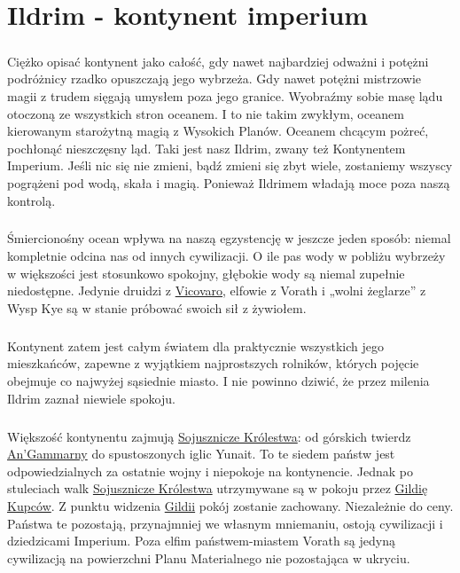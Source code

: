 \chapter{Ildrim - kontynent imperium}

\paragraph{}
Ciężko opisać kontynent jako całość, gdy nawet najbardziej odważni i potężni podróżnicy rzadko opuszczają jego wybrzeża.
Gdy nawet potężni mistrzowie magii z trudem sięgają umysłem poza jego granice. 
Wyobraźmy sobie masę lądu otoczoną ze wszystkich stron oceanem.
I to nie takim zwykłym, oceanem kierowanym starożytną magią z Wysokich Planów.
Oceanem chcącym pożreć, pochłonąć nieszczęsny ląd.
Taki jest nasz Ildrim, zwany też Kontynentem Imperium.
Jeśli nic się nie zmieni, bądź zmieni się zbyt wiele, zostaniemy wszyscy pogrążeni pod wodą, skała i magią.
Ponieważ Ildrimem władają moce poza naszą kontrolą.

\paragraph{}
Śmiercionośny ocean wpływa na naszą egzystencję w jeszcze jeden sposób: niemal kompletnie odcina nas od innych cywilizacji.
O ile pas wody w pobliżu wybrzeży w większości jest stosunkowo spokojny, głębokie wody są niemal zupełnie niedostępne.
Jedynie druidzi z \hyperref[Vicovaro]{Vicovaro}, elfowie z Vorath i „wolni żeglarze” z Wysp Kye są w stanie próbować swoich sił z żywiołem.

\paragraph{}
Kontynent zatem jest całym światem dla praktycznie wszystkich jego mieszkańców, zapewne z  wyjątkiem najprostszych rolników, których pojęcie obejmuje co najwyżej sąsiednie miasto.
I nie powinno dziwić, że przez milenia Ildrim zaznał niewiele spokoju.

\paragraph{}
Większość kontynentu zajmują \hyperref[SojuszniczeKrolestwa]{Sojusznicze Królestwa}: od górskich twierdz \hyperref[AnGammarna]{An’Gammarny} do spustoszonych iglic Yunait.
To te siedem państw jest odpowiedzialnych za ostatnie wojny i niepokoje na kontynencie.
Jednak po stuleciach walk \hyperref[SojuszniczeKrolestwa]{Sojusznicze Królestwa} utrzymywane są w pokoju przez \hyperref[GildiaKupcow]{Gildię Kupców}.
Z punktu widzenia \hyperref[GildiaKupcow]{Gildii} pokój zostanie zachowany.
Niezależnie do ceny.
Państwa te pozostają, przynajmniej we własnym mniemaniu, ostoją cywilizacji i dziedzicami Imperium.
Poza elfim państwem-miastem Vorath są jedyną cywilizacją na powierzchni Planu Materialnego nie pozostająca w ukryciu.

